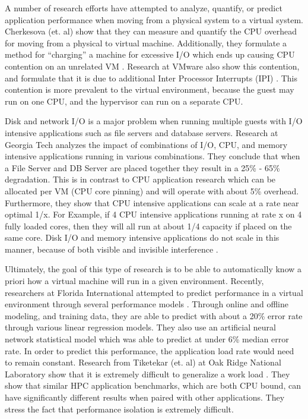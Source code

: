 A number of research efforts have attempted to analyze, quantify, or predict application performance when moving from a physical system to a virtual system.   Cherkesova (et. al) show that they can measure and quantify the CPU overhead for moving from a physical to virtual machine.  Additionally, they formulate a method for “charging” a machine for excessive I/O which ends up causing CPU contention on an unrelated VM \cite{cherkasova}.  Research at VMware also show this contention, and formulate that it is due to additional Inter Processor Interrupts (IPI) \cite{ahmad}.   This contention is more prevalent to the virtual environment, because the guest may run on one CPU, and the hypervisor can run on a separate CPU. 
 
\indent Disk and network I/O is a major problem when running multiple guests with I/O intensive applications such as file servers and database servers.  Research at Georgia Tech \cite{paul} analyzes the impact of combinations of I/O, CPU, and memory intensive applications running in various combinations.  They conclude that when a File Server and DB Server are placed together they result in a 25\% - 65\% degradation.  This is in contrast to CPU application research \cite{huber1, huber2} which can be allocated per VM (CPU core pinning) and will operate with about 5\% overhead.  Furthermore, they show that CPU intensive applications can scale at a rate near optimal 1/x.   For Example, if 4 CPU intensive applications running at rate x on 4 fully loaded cores, then they will all run at about 1/4 capacity if placed on the same core.   Disk I/O and memory intensive applications do not scale in this manner, because of both visible and invisible interference \cite{tickoo}.

\indent Ultimately, the goal of this type of research is to be able to automatically know a priori how a virtual machine will run in a given environment.  Recently, researchers at Florida International attempted to predict performance in a virtual environment through several performance models \cite{kundu}.  Through online and offline modeling, and training data, they are able to predict with about a 20\% error rate through various linear regression models.  They also use an artificial neural network statistical model which was able to predict at under 6\% median error rate.   In order to predict this performance, the application load rate would need to remain constant.  Research from Tiketekar (et. al) at Oak Ridge National Laboratory show that it is extremely difficult to generalize a work load \cite{tikotekar}.  They show that similar HPC application benchmarks, which are both CPU bound, can have significantly different results when paired with other applications.  They stress the fact that performance isolation is extremely difficult.


